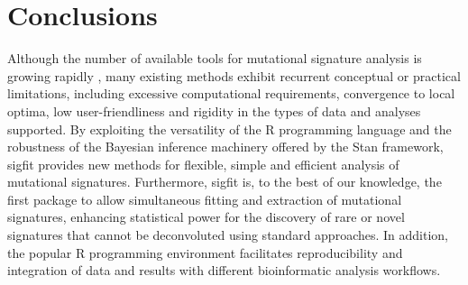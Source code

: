 \section*{Conclusions}
Although the number of available tools for mutational signature analysis is growing rapidly \cite{Baez-Ortega2017}, many existing methods exhibit recurrent conceptual or practical limitations, including excessive computational requirements, convergence to local optima, low user-friendliness and rigidity in the types of data and analyses supported. By exploiting the versatility of the R programming language and the robustness of the Bayesian inference machinery offered by the Stan \cite{stanMain} framework, sigfit provides new methods for flexible, simple and efficient analysis of mutational signatures. Furthermore, sigfit is, to the best of our knowledge, the first package to allow simultaneous fitting and extraction of mutational signatures, enhancing statistical power for the discovery of rare or novel signatures that cannot be deconvoluted using standard approaches. In addition, the popular R programming environment facilitates reproducibility and integration of data and results with different bioinformatic analysis workflows.